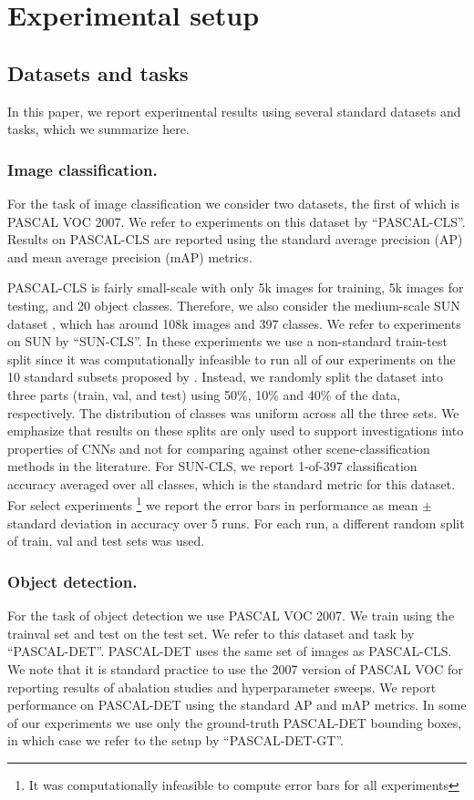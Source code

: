 \section{Experimental setup}
\label{sec:train}

\subsection{Datasets and tasks}
In this paper, we report experimental results using several standard datasets and tasks, which we summarize here.

\subsubsection{Image classification.} For the task of image classification we consider two datasets, the first of which is PASCAL VOC 2007.
We refer to experiments on this dataset by ``PASCAL-CLS''.
Results on PASCAL-CLS are reported using the standard average precision (AP) and mean average precision (mAP) metrics.

PASCAL-CLS is fairly small-scale with only 5k images for training, 5k images for testing, and 20 object classes.
Therefore, we also consider the medium-scale SUN dataset \cite{sun}, which has around 108k images and 397 classes.
We refer to experiments on SUN by ``SUN-CLS''.
In these experiments we use a non-standard train-test split since it was computationally infeasible to run all of our experiments on the 10 standard subsets proposed by \cite{sun}. 
Instead, we randomly split the dataset into three parts (train, val, and test) using 50\%, 10\% and 40\% of the data, respectively. 
The distribution of classes was uniform across all the three sets.
We emphasize that results on these splits are only used to support investigations into properties of CNNs and not for comparing against other scene-classification methods in the literature.
For SUN-CLS, we report 1-of-397 classification accuracy averaged over all classes, which is the standard metric for this dataset.
For select experiments \footnote{It was computationally infeasible to compute error bars for all experiments} we report the error bars in performance as mean $\pm$ standard deviation in accuracy over 5 runs. For each run, a different random split of train, val and test sets was used.  

\subsubsection{Object detection.} For the task of object detection we use PASCAL VOC 2007.
We train using the trainval set and test on the test set.
We refer to this dataset and task by ``PASCAL-DET''.
PASCAL-DET uses the same set of images as PASCAL-CLS.
We note that it is standard practice to use the 2007 version of PASCAL VOC for reporting results of abalation studies and hyperparameter sweeps.
We report performance on PASCAL-DET using the standard AP and mAP metrics.
In some of our experiments we use only the ground-truth PASCAL-DET bounding boxes, in which case we refer to the setup by ``PASCAL-DET-GT''.

